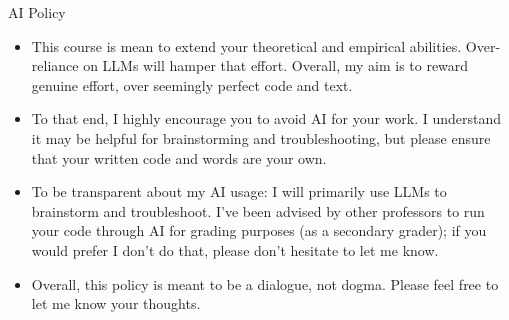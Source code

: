 \documentclass[handout, 8pt]{beamer}
\begin{document}
\begin{frame}{AI Policy}

\begin{itemize}
\item This course is mean to extend your theoretical and empirical abilities. 
Over-reliance on LLMs will hamper that effort. 
Overall, my aim is to reward genuine effort, over seemingly perfect code and text. 
\item To that end, I highly encourage you to avoid AI for your work. 
I understand it may be helpful for brainstorming and troubleshooting, but please ensure that your written code and words are your own. 

\item To be transparent about my AI usage: I will primarily use LLMs to brainstorm and troubleshoot. 
I've been advised by other professors to run your code through AI for grading purposes (as a secondary grader); if you would prefer I don't do that, please don't hesitate to let me know. 

\item Overall, this policy is meant to be a dialogue, not dogma. 
Please feel free to let me know your thoughts. 

\end{itemize}

\end{frame}
\end{document}
